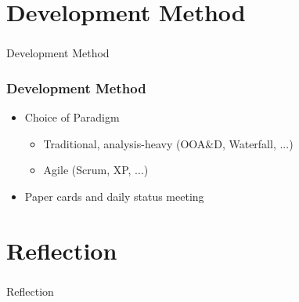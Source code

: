 \section[Dev. Method]{Development Method}

\begin{frame}
  \frametitle{}
  \begin{center}
    {\Huge Development Method}
  \end{center}
\end{frame}

\begin{frame}
    \frametitle{Development Method}
    \begin{itemize}
			\item Choice of Paradigm
		  \begin{itemize}
				\item Traditional, analysis-heavy (OOA\&D, Waterfall, ...)
				\item Agile (Scrum, XP, ...)
			\end{itemize}
			\item Paper cards and daily status meeting
		\end{itemize}
\end{frame}

\section[Reflection]{Reflection}

\begin{frame}
  \frametitle{}
  \begin{center}
    {\Huge Reflection}
  \end{center}
\end{frame}

